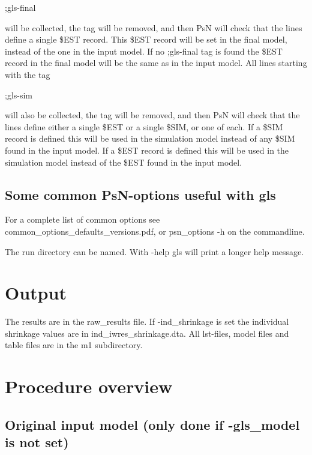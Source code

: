 \begin{optionlist}
;gls-final

will be collected, the tag will be removed, and then PsN will check that the lines define a single \$EST record. This \$EST record will be set in the final model, instead of the one in the input model. If no ;gls-final tag is found the \$EST record in the final model will be the same as in the input model. All lines starting with the tag

;gls-sim

will also be collected, the tag will be removed, and then PsN will check that the lines define either a single \$EST or a single \$SIM, or one of each. If a \$SIM record is defined this will be used in the simulation model instead of any \$SIM found in the input model. If a \$EST record is defined this will be used in the simulation model instead of the \$EST found in the input model.\\
\nextopt
\end{optionlist}

\subsection{Some common PsN-options useful with gls}

For a complete list of common options see common\_options\_defaults\_versions.pdf, or psn\_options -h on the commandline.

\begin{optionlist}
The run directory can be named.  
\nextopt
{}
With -help gls will print a longer help message. 
\nextopt
\end{optionlist}

\section{Output}

The results are in the raw\_results file. If -ind\_shrinkage is set the individual shrinkage values are in ind\_iwres\_shrinkage.dta. All lst-files, model files and table files are in the m1 subdirectory.

\section{Procedure overview}

\subsection{Original input model (only done if -gls\_model is not set)}

